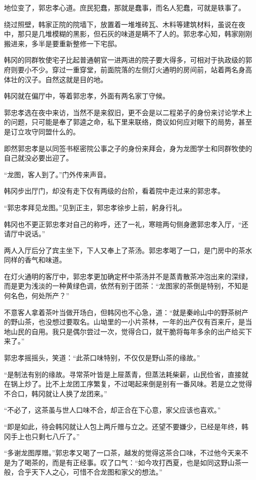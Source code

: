 地位变了，郭忠孝心道。庶民犯蠢，那就是蠢事，而名人犯蠢，可就是轶事了。

绕过照壁，韩家正院的院墙下，放置着一堆堆砖瓦、木料等建筑材料，虽说在夜中，那只是几堆模糊的黑影，但石灰的味道是瞒不了人的。郭忠孝心知，韩家刚刚搬进来，多半是要重新整修一下宅邸。

韩冈的同群牧使宅子比起普通朝官一进两进的院子要大得多，可相对于执政级的郭府则要小不少。穿过一重穿堂，前面院落的左侧灯火通明的房间前，站着两名身高体壮的汉子。自然这就是目的地。

韩冈就在偏厅中，等着郭忠孝，外面有两名家丁守候。

郭忠孝选在夜中来访，当然不是来叙旧，更不会是以二程弟子的身份来讨论学术上的问题，只可能是奉了郭逵之命，私下里来联络，商议如何应对眼下的局势，甚至是订立攻守同盟什么的。

即然郭忠孝是以同签书枢密院公事之子的身份来拜会，身为龙图学士和同群牧使的自己就没必要出迎了。

“龙图，客人到了。”门外传来声音。

韩冈步出厅门，却没有走下仅有两级的台阶，看着院中走过来的郭忠孝。

“郭忠孝拜见龙图。”见到正主，郭忠孝徐步上前，躬身行礼。

韩冈也不更正郭忠孝对自己的称呼，还了一礼，寒暄两句侧身邀郭忠孝入厅，“还请厅中说话。”

两人入厅后分了宾主坐下，下人又奉上了茶汤。郭忠孝喝了一口，是门房中的茶水同样的香气和味道。

在灯火通明的客厅中，郭忠孝更加确定杯中茶汤并不是蒸青散茶冲泡出来的深绿，而是更为浅淡的一种黄绿色调，依然有别于团茶：“龙图家的茶倒是特别，不知是何名色，何处所产？”

不意客人拿着茶叶当做开场白，但韩冈也不心急，道：“就是秦岭山中的野茶树产的野山茶，也没想过要取名。山坳里的一小片茶林，一年的出产仅有百来斤，是当地山民的自用。我只是偶尔尝过一次，觉得合口，就干脆将每年多余的出产给买下来了。”

郭忠孝摇摇头，笑道：“此茶口味特别，不仅仅是野山茶的缘故。”

“是制法有别的缘故。寻常茶叶皆是上屉蒸青，但蒸法耗柴薪，山民俭省，直接就在锅上炒了。比不上龙团工序繁复，不过喝起来倒是别有一番风味。若是立之觉得不合口，韩冈就让人换了龙团来。”

“不必了，这茶虽与世人口味不合，却正合在下心意，家父应该也喜欢。”

“即是如此，待会韩冈就让人包上两斤赠与立之。还望不要嫌少，已经是年终，韩冈手上也只剩七八斤了。”

“多谢龙图厚赠。”郭忠孝又喝了一口茶，越发的觉得这茶合口味，不过他今天来不是为了喝茶的，而是有正经事。叹了口气：“如今攻打西夏，也是如同这野山茶一般，合乎天下人之心，可惜不合龙图和家父的想法。”

